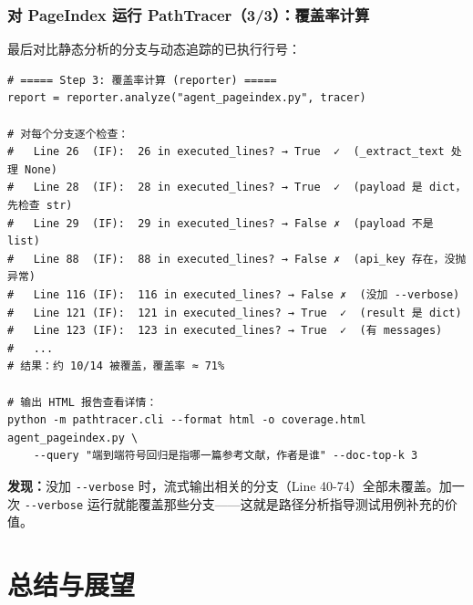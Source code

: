 \documentclass[presentation,aspectratio=169]{ctexbeamer}
\begin{document}
\begin{frame}[fragile]
\frametitle{对 PageIndex 运行 PathTracer（3/3）：覆盖率计算}
{\scriptsize 最后对比静态分析的分支与动态追踪的已执行行号：}

\vspace{0.05cm}
{\tiny
\begin{verbatim}
# ===== Step 3: 覆盖率计算 (reporter) =====
report = reporter.analyze("agent_pageindex.py", tracer)

# 对每个分支逐个检查：
#   Line 26  (IF):  26 in executed_lines? → True  ✓  (_extract_text 处理 None)
#   Line 28  (IF):  28 in executed_lines? → True  ✓  (payload 是 dict，先检查 str)
#   Line 29  (IF):  29 in executed_lines? → False ✗  (payload 不是 list)
#   Line 88  (IF):  88 in executed_lines? → False ✗  (api_key 存在，没抛异常)
#   Line 116 (IF):  116 in executed_lines? → False ✗  (没加 --verbose)
#   Line 121 (IF):  121 in executed_lines? → True  ✓  (result 是 dict)
#   Line 123 (IF):  123 in executed_lines? → True  ✓  (有 messages)
#   ...
# 结果：约 10/14 被覆盖，覆盖率 ≈ 71%

# 输出 HTML 报告查看详情：
python -m pathtracer.cli --format html -o coverage.html agent_pageindex.py \
    --query "端到端符号回归是指哪一篇参考文献，作者是谁" --doc-top-k 3
\end{verbatim}}

\vspace{0.05cm}
{\scriptsize \textbf{发现：}没加 \texttt{-{}-verbose} 时，流式输出相关的分支（Line 40-74）全部未覆盖。加一次 \texttt{-{}-verbose} 运行就能覆盖那些分支——这就是路径分析指导测试用例补充的价值。}
\end{frame}

\section{总结与展望}
\end{document}
